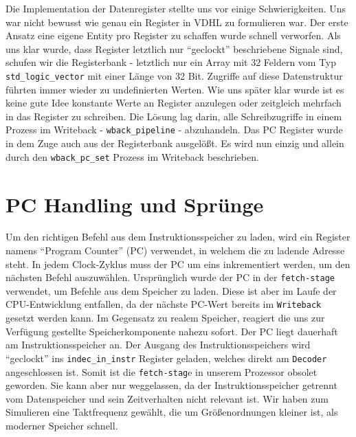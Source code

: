 \documentclass[paper=a4,fontsize=11pt,twocolumn]{scrreprt}
\begin{document}
Die Implementation der Datenregister stellte uns vor einige Schwierigkeiten.
Uns war nicht bewusst wie genau ein Register in VDHL zu formulieren war.
Der erste Ansatz eine eigene Entity pro Register zu schaffen wurde schnell verworfen.
Als uns klar wurde, dass Register letztlich nur \enquote{geclockt} beschriebene Signale sind, schufen wir die Registerbank - letztlich nur ein Array mit 32 Feldern vom  Typ \texttt{std\_logic\_vector} mit einer Länge von 32 Bit.
Zugriffe auf diese Datenstruktur führten immer wieder zu undefinierten Werten.
Wie uns später klar wurde ist es keine gute Idee konstante Werte an Register anzulegen oder zeitgleich mehrfach in das Register zu schreiben.
Die Lösung lag darin, alle Schreibzugriffe in einem Prozess im Writeback - \texttt{wback\_pipeline} - abzuhandeln.
Das PC Register wurde in dem Zuge auch aus der Registerbank ausgelößt. 
Es wird nun einzig und allein durch den \texttt{wback\_pc\_set} Prozess im Writeback beschrieben.


\section{PC Handling und Sprünge}
\label{sec:pc_handling_und_spruenge}

Um den richtigen Befehl aus dem Instruktionsspeicher zu laden, wird ein Register namens \enquote{Program Counter} (PC) verwendet, in welchem die zu ladende Adresse steht.
In jedem Clock-Zyklus muss der PC um eins inkrementiert werden, um den nächsten Befehl auszuwählen.
Ursprünglich wurde der PC in der \texttt{fetch-stage} verwendet, um Befehle aus dem Speicher zu laden.
Diese ist aber im Laufe der CPU-Entwicklung entfallen, da der nächste PC-Wert bereits im \texttt{Writeback} gesetzt werden kann.
Im Gegensatz zu realem Speicher, reagiert die uns zur Verfügung gestellte Speicherkomponente nahezu sofort.
Der PC liegt dauerhaft am Instruktionsspeicher an.
Der Ausgang des Instruktionsspeichers wird \enquote{geclockt} ins \texttt{indec\_in\_instr} Register geladen, welches direkt am \texttt{Decoder} angeschlossen ist.
Somit ist die \texttt{fetch-stag}e in unserem Prozessor obsolet geworden.
Sie kann aber nur weggelassen, da der Instruktionsspeicher getrennt vom Datenspeicher und sein Zeitverhalten nicht relevant ist.
Wir haben zum Simulieren eine Taktfrequenz gewählt, die um Größenordnungen kleiner ist, als moderner Speicher schnell.
\end{document}
